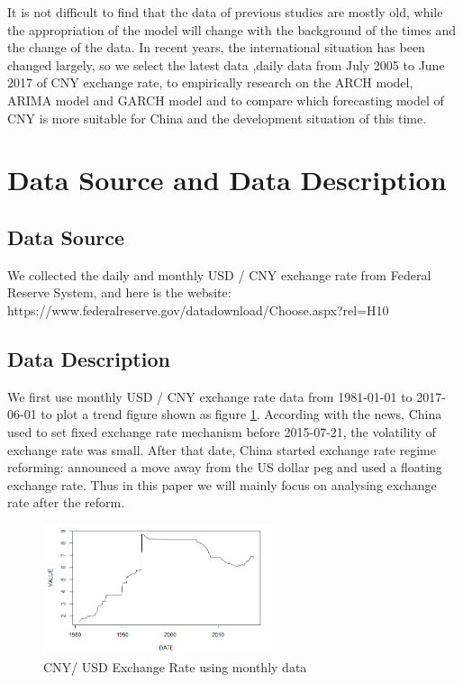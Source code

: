 \documentclass[12pt, a4paper, titlepage]{article}
\begin{document}
It is not difficult to find that the data of previous studies are mostly old, while the appropriation of the model will change with the background of the times and the change of the data. In recent years, the international situation has been changed largely, so we select the latest data ,daily data from July 2005 to June 2017 of CNY exchange rate, to empirically research on the ARCH model, ARIMA model and GARCH model and to compare which forecasting model of CNY is more suitable for China and the development situation of this time.\\

\section{Data Source and Data Description}
\subsection{Data Source}
We collected the daily and monthly USD / CNY exchange rate from Federal Reserve System, and here is the website:
https://www.federalreserve.gov/datadownload/Choose.aspx?rel=H10 \\

\subsection{Data Description}
We first use monthly USD / CNY exchange rate data from 1981-01-01 to 2017-06-01 to plot a trend figure shown as figure \ref{monthly}. According with the news, China used to set fixed exchange rate mechanism before 2015-07-21, the volatility of exchange rate was small. After that date, China started exchange rate regime reforming: announced a move away from the US dollar peg and used a floating exchange rate. Thus in this paper we will mainly focus on analysing exchange rate after the reform.\\ 
\begin{figure}
\begin{center}
\caption{CNY/ USD Exchange Rate using monthly data}\label{monthly}
\includegraphics[width=0.6\textwidth]{monthly.png} 
\end{center}
\end{figure}
\end{document}
